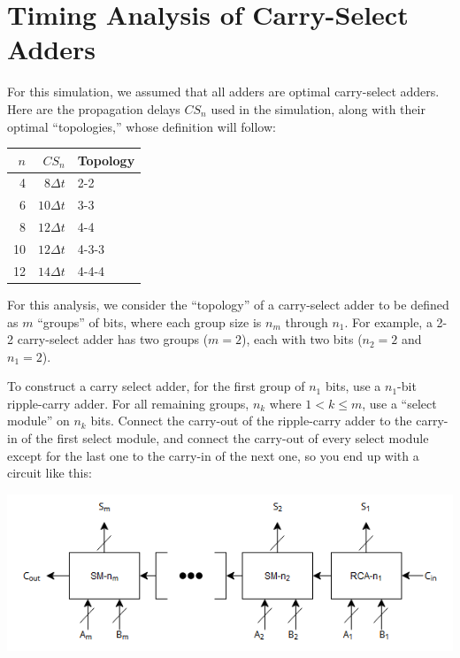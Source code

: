 \documentclass[12pt]{article}
\begin{document}
\newpage
\appendix

\section{Timing Analysis of Carry-Select Adders}
\label{app:carry-select-timing}

For this simulation, we assumed that all adders are optimal carry-select
adders. Here are the propagation delays $CS_n$ used in the simulation, along
with their optimal ``topologies,'' whose definition will follow:

\vspace{12pt}
\begin{tabular}{|r|r|l|}
    \hline
    $n$ & $CS_n$ & Topology \\
    \hline
    4 & $8\Delta t$ & 2-2 \\
    6 & $10\Delta t$ & 3-3 \\
    8 & $12\Delta t$ & 4-4 \\
    10 & $12\Delta t$ & 4-3-3 \\
    12 & $14\Delta t$ & 4-4-4 \\
    \hline
\end{tabular}
\vspace{12pt}

For this analysis, we consider the ``topology'' of a carry-select adder to be
defined as $m$ ``groups'' of bits, where each group size is $n_m$ through
$n_1$. For example, a 2-2 carry-select adder has two groups ($m = 2$), each with
two bits ($n_2 = 2$ and $n_1 = 2$).

To construct a carry select adder, for the first group of $n_1$ bits, use a
$n_1$-bit ripple-carry adder. For all remaining groups, $n_k$ where $1 < k \le
m$, use a ``select module'' on $n_k$ bits. Connect the carry-out of the
ripple-carry adder to the carry-in of the first select module, and connect the
carry-out of every select module except for the last one to the carry-in of the
next one, so you end up with a circuit like this:

\includegraphics{carry-select.png}
\end{document}
